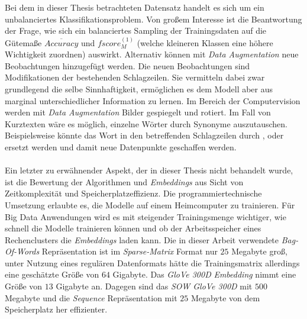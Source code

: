 \documentclass[a4paper,11pt]{article}
\begin{document}
Bei dem in dieser Thesis betrachteten Datensatz handelt es sich um ein unbalanciertes Klassifikationsproblem. Von großem Interesse ist die Beantwortung der Frage, wie sich ein balanciertes Sampling der Trainingsdaten auf die Gütemaße $\overline{Accuracy}$ und $fscore_M^{(1)}$ (welche kleineren Klassen eine höhere Wichtigkeit zuordnen) auswirkt. Alternativ können mit \textit{Data Augmentation} neue Beobachtungen hinzugefügt werden. Die neuen Beobachtungen sind Modifikationen der bestehenden Schlagzeilen. Sie vermitteln dabei zwar grundlegend die selbe Sinnhaftigkeit, ermöglichen es dem Modell aber aus marginal unterschiedlicher Information zu lernen. Im Bereich der Computervision werden mit \textit{Data Augmentation} Bilder gespiegelt und rotiert. Im Fall von Kurztexten wäre es möglich, einzelne Wörter durch Synonyme auszutauschen. Beispielsweise könnte das Wort  in den betreffenden Schlagzeilen durch ,  oder  ersetzt werden und damit neue Datenpunkte geschaffen werden.\\
\\
Ein letzter zu erwähnender Aspekt, der in dieser Thesis nicht behandelt wurde, ist die Bewertung der Algorithmen und \textit{Embeddings} aus Sicht von Zeitkomplexität und Speicherplatzeffizienz. Die programmiertechnische Umsetzung erlaubte es, die Modelle auf einem Heimcomputer zu trainieren. Für Big Data Anwendungen wird es mit steigender Trainingsmenge wichtiger, wie schnell die Modelle trainieren können und ob der Arbeitsspeicher eines Rechenclusters die \textit{Embeddings} laden kann. Die in dieser Arbeit verwendete \textit{Bag-Of-Words} Repräsentation ist im \textit{Sparse-Matrix} Format nur $25$ Megabyte groß, unter Nutzung eines regulären Datenformats hätte die Trainingsmatrix allerdings eine geschätzte Größe von $64$ Gigabyte. Das \textit{GloVe 300D} \textit{Embedding} nimmt eine Größe von $13$ Gigabyte an. Dagegen sind das \textit{SOW GloVe 300D} mit $500$ Megabyte und die \textit{Sequence} Repräsentation mit $25$ Megabyte von dem Speicherplatz her effizienter.


\newpage
\end{document}
